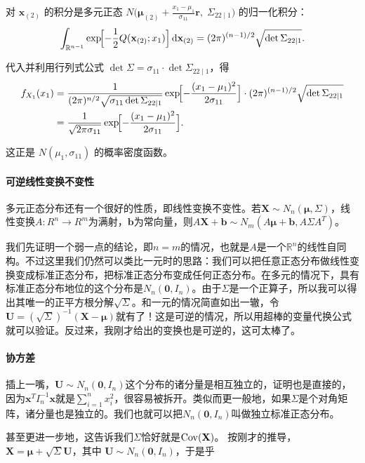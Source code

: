 对 $\mathbf{x}_{(2)}$ 的积分是多元正态 $N\bigl(\boldsymbol{\mu}_{(2)} + \tfrac{x_1 - \mu_1}{\sigma_{11}}\mathbf{r},\; \Sigma_{22\mid 1}\bigr)$ 的归一化积分：
\[
\int_{\mathbb{R}^{n-1}} \exp\!\Bigl[ -\frac{1}{2} Q(\mathbf{x}_{(2)}; x_1) \Bigr] \mathop{}\!\mathrm{d}\mathbf{x}_{(2)}
= (2\pi)^{(n-1)/2} \sqrt{\det \Sigma_{22\mid 1}}.
\]

代入并利用行列式公式 $\det \Sigma = \sigma_{11} \cdot \det \Sigma_{22\mid 1}$，得
\begin{align*}
f_{X_1}(x_1)
&= \frac{1}{(2\pi)^{n/2} \sqrt{\sigma_{11} \det \Sigma_{22\mid 1}}}
\exp\!\Bigl[ -\frac{(x_1 - \mu_1)^2}{2\sigma_{11}} \Bigr]
\cdot (2\pi)^{(n-1)/2} \sqrt{\det \Sigma_{22\mid 1}} \\
&= \frac{1}{\sqrt{2\pi\sigma_{11}}}
\exp\!\Bigl[ -\frac{(x_1 - \mu_1)^2}{2\sigma_{11}} \Bigr].
\end{align*}

这正是 $N(\mu_1, \sigma_{11})$ 的概率密度函数。

\paragraph{可逆线性变换不变性}
多元正态分布还有一个很好的性质，即线性变换不变性。若$\mathbf{X}\sim N_n(\boldsymbol{\mu},\Sigma)$，线性变换$A:R^n\to R^m$为满射，$\mathbf{b}$为常向量，则$A\mathbf{X}+\mathbf{b}\sim N_m(A\boldsymbol{\mu}+\mathbf{b}, A\Sigma A^T)$。

我们先证明一个弱一点的结论，即$n=m$的情况，也就是$A$是一个$\mathbb{R}^n$的线性自同构。不过这里我们仍然可以类比一元时的思路：我们可以把任意正态分布做线性变换变成标准正态分布，把标准正态分布变成任何正态分布。在多元的情况下，具有标准正态分布地位的这个分布是$N_n(\mathbf{0},I_n)$。由于$\Sigma$是一个正算子，所以我可以得出其唯一的正平方根分解$\sqrt{\Sigma}$。和一元的情况简直如出一辙，令$\mathbf{U}= (\sqrt{\Sigma})^{-1}(\mathbf{X}-\boldsymbol{\mu})$就有了！这是可逆的情况，所以用超棒的变量代换公式就可以验证。反过来，我刚才给出的变换也是可逆的，这可太棒了。

\paragraph{协方差}
插上一嘴，$\mathbf{U}\sim N_n(\mathbf{0},I_n)$这个分布的诸分量是相互独立的，证明也是直接的，因为$\mathbf{x}^TI_n^{-1}\mathbf{x}$就是$\sum_{i=1}^nx_i^2$，很容易被拆开。类似而更一般地，如果$\Sigma$是个对角矩阵，诸分量也是独立的。我们也就可以把$N_n(\mathbf{0},I_n)$叫做独立标准正态分布。

甚至更进一步地，这告诉我们$\Sigma$恰好就是$\operatorname{Cov}(\mathbf{X})$。
按刚才的推导，$\mathbf{X} = \boldsymbol{\mu} + \sqrt{\Sigma} \mathbf{U}$，其中 $\mathbf{U} \sim N_n(\mathbf{0},I_n)$，于是乎

